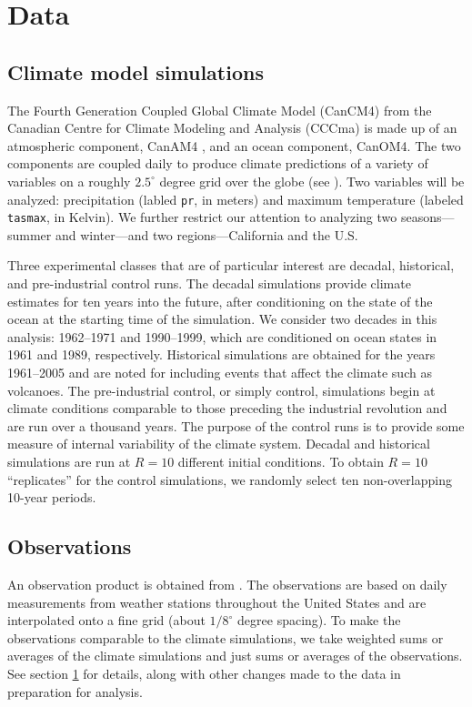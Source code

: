 \section{Data}
\label{process}

\subsection{Climate model simulations}


The Fourth Generation Coupled Global Climate Model (CanCM4) from the Canadian Centre for Climate Modeling and Analysis (CCCma) is made up of an atmospheric component, CanAM4 \citep{von2013canadian}, and an ocean component, CanOM4. The two components are coupled daily to produce climate predictions of a variety of variables on a roughly $2.5^\circ$ degree grid over the globe (see \cite{merryfield2013canadian}). Two variables will be analyzed: precipitation (labled \texttt{pr}, in meters) and maximum temperature (labeled \texttt{tasmax}, in Kelvin). We further restrict our attention to analyzing two seasons---summer and winter---and two regions---California and the U.S.

Three experimental classes that are of particular interest are decadal, historical, and pre-industrial control runs. The decadal simulations provide climate estimates for ten years into the future, after conditioning on the state of the ocean at the starting time of the simulation. We consider two decades in this analysis: 1962--1971 and 1990--1999, which are conditioned on ocean states in 1961 and 1989, respectively. Historical simulations are obtained for the years 1961--2005 and are noted for including events that affect the climate such as volcanoes. The pre-industrial control, or simply control, simulations begin at climate conditions comparable to those preceding the industrial revolution and are run over a thousand years. The purpose of the control runs is to provide some measure of internal variability of the climate system. Decadal and historical simulations are run at $R=10$ different initial conditions. To obtain $R=10$ ``replicates'' for the control simulations, we randomly select ten non-overlapping 10-year periods.

\subsection{Observations}

An observation product is obtained from \cite{maurer2002long}. The observations are based on daily measurements from weather stations throughout the United States and are interpolated onto a fine grid (about $1/8^\circ$ degree spacing). To make the observations comparable to the climate simulations, we take weighted sums or averages of the climate simulations and just sums or averages of the observations. See section \ref{process} for details, along with other changes made to the data in preparation for analysis.

